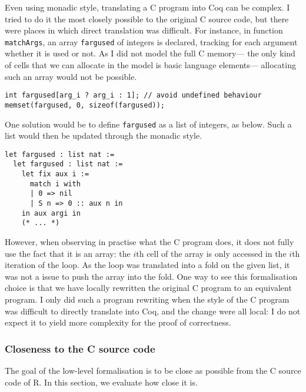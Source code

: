 \documentclass{article}
\newcommand\Coq{Coq}
\newcommand\R{R}
\newcommand\Cn{C}
\begin{document}
Even using monadic style,
translating a \Cn{} program into \Coq{} can be complex.
I tried to do it the most closely possible to the original
\Cn{} source code,
but there were places in which direct translation was difficult.
For instance, in function \texttt{matchArgs},
an array \texttt{fargused} of integers is declared,
tracking for each argument whether it is used or not.
As I did not model the full \Cn{} memory—%
the only kind of cells that we can allocate in the model
is basic language elements—%
allocating such an array would not be possible.
\begin{verbatim}
int fargused[arg_i ? arg_i : 1]; // avoid undefined behaviour
memset(fargused, 0, sizeof(fargused));
\end{verbatim}

One solution would be to define \texttt{fargused}
as a list of integers, as below.
Such a list would then be updated through the monadic style.
\begin{verbatim}
let fargused : list nat :=
  let fargused : list nat :=
    let fix aux i :=
      match i with
      | 0 => nil
      | S n => 0 :: aux n in
    in aux argi in
    (* ... *)
\end{verbatim}

However, when observing in practise what the \Cn{} program
does, it does not fully use the fact that it is an array:
the \(i\)th cell of the array is only accessed in the \(i\)th
iteration of the loop.
As the loop was translated into a fold on the given list,
it was not a issue to push the array into the fold.
One way to see this formalisation choice
is that we have locally rewritten the original \Cn{} program
to an equivalent program.
I only did such a program rewriting when the style of the \Cn{}
program was difficult to directly translate into \Coq{},
and the change were all local:
I do not expect it to yield more complexity for the proof of correctness.


\subsubsection{Closeness to the \Cn{} source code}

The goal of the low-level formalisation is to be close as possible
from the \Cn{} source code of \R{}.
In this section, we evaluate how close it is.
\end{document}
